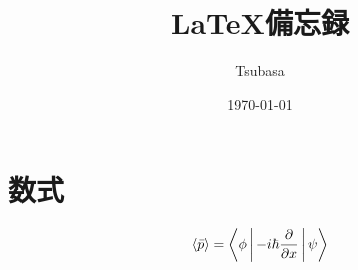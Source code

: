 \documentclass[a4paper]{ltjsarticle}
\begin{document}
\title{\LaTeX 備忘録}
\author{Tsubasa}
\date{\today}
\maketitle

\section{数式}

\begin{texexample}
$$ \Braket{\bar{p}} = \Braket{\phi | -i \hbar \frac{\partial}{\partial x} | \psi } $$
\end{texexample}

\end{document}

